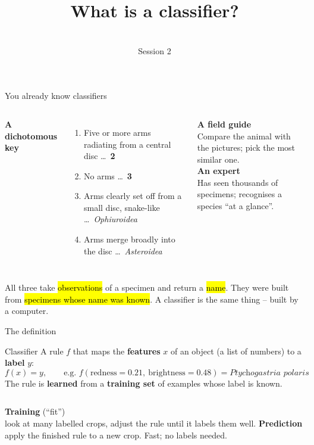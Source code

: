 \documentclass[aspectratio=169,11pt]{beamer}
\title{What is a classifier?}
\subtitle{\coursetitle\\[2pt]\small Session 2}
\date{}
\author{}
\begin{document}
\maketitle

\begin{frame}{You already know classifiers}
\begin{columns}[T]
\textbf{A dichotomous key}
\begin{enumerate}\small
  \item[1a] Five or more arms radiating from a central disc \dots\ \textbf{2}
  \item[1b] No arms \dots\ \textbf{3}
  \item[2a] Arms clearly set off from a small disc, snake-like \dots\ \emph{Ophiuroidea}
  \item[2b] Arms merge broadly into the disc \dots\ \emph{Asteroidea}
\end{enumerate}
\textbf{A field guide}\\[2pt]
\small Compare the animal with the pictures; pick the most similar one.\\[10pt]
\normalsize\textbf{An expert}\\[2pt]
\small Has seen thousands of specimens; recognises a species ``at a glance''.
\end{columns}
\vspace{10pt}
\begin{block}{All three}
take \hl{observations} of a specimen and return a \hl{name}. They were built from \hl{specimens whose name was known}.
A classifier is the same thing -- built by a computer.
\end{block}
\end{frame}

\begin{frame}{The definition}
\begin{block}{Classifier}
A rule $f$ that maps the \textbf{features} $x$ of an object (a list of numbers) to a \textbf{label} $y$:
\[ f(x) = y, \qquad \text{e.g. } f(\text{redness}=0.21,\ \text{brightness}=0.48) = \textit{Ptychogastria polaris} \]
The rule is \textbf{learned} from a \textbf{training set} of examples whose label is known.
\end{block}
\vspace{4pt}
\begin{columns}[T]
\textbf{Training} (``fit'')\\
\small look at many labelled crops, adjust the rule until it labels them well.
\textbf{Prediction}\\
\small apply the finished rule to a new crop. Fast; no labels needed.
\end{columns}
\vspace{8pt}
\end{frame}
\end{document}

